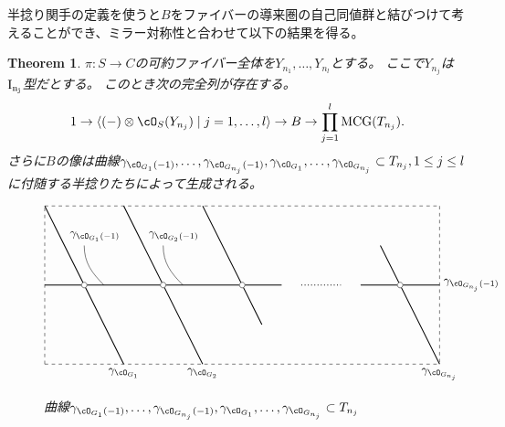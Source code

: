 \documentclass[uplatex,a4paper,dvipdfmx]{jsarticle}
\theoremstyle{plain}
\newtheorem{theorem}{Theorem}[section]
\theoremstyle{definition}
\DeclareMathOperator{\MCG}{\mathrm{MCG}}
\begin{document}
半捻り関手の定義を使うと$B$をファイバーの導来圏の自己同値群と結びつけて考えることができ、ミラー対称性と合わせて以下の結果を得る。
\begin{theorem}
	$\pi \colon S \to C$の可約ファイバー全体を$Y_{n_1}, \dots, Y_{n_l}$とする。
	ここで$Y_{n_j}$は$\rm{I}_{n_j}$型だとする。
	このとき次の完全列が存在する。
	\begin{equation}
		1 \to \langle (-)\otimes \cO_S(Y_{n_j}) \mid j = 1, \dots, l\rangle \to B \to \prod_{j=1}^l \MCG(T_{n_j}).
	\end{equation}
	さらに$B$の像は曲線$\gamma_{\cO_{G_1}(-1)}, \dots, \gamma_{\cO_{G_{n_j}}(-1)}, \gamma_{\cO_{G_1}}, \dots, \gamma_{\cO_{G_{n_j}}} \subset T_{n_j}, 1\leq j \leq l$に付随する半捻りたちによって生成される。
	\begin{figure}[h]
		\centering
		\begin{displaymath}
			\begin{tikzpicture}[scale=1.2]
				\draw[dashed] (0,0)--(10,0);
				\draw[dashed] (0,0)--(0,4);
				\draw[dashed] (0,4)--(10,4);
				\draw[dashed] (10,4)--(10,0);

				\draw[thick] (0, 2)--(1, 2);
				\draw[thick] (1, 2)--(3, 2);
				\draw[thick] (3, 2)--(5, 2);
				\draw[thick] (5, 2)--(6, 2);
				\draw[thick] (8, 2)--(9, 2);
				\draw[thick] (9, 2)--(10, 2);


				\draw[thick] (0, 4)--(1, 2);
				\draw[thick] (1, 2)--(2, 0);
				\draw[thick] (2, 4)--(4, 0);
				\draw[thick] (4, 4)--(5, 2);
				\draw[thick] (5, 2)--(5.5, 1);
				\draw[thick] (8.5, 3)--(9, 2);
				\draw[thick] (9, 2)--(10, 0);

				\draw[dotted, thick] (5+1.5, 2)--(9-1.5, 2);
				\foreach \u in {1, 3, 5, 9}
					{
						\filldraw[white] (\u, 2) circle (2pt);
						\draw[black] (\u, 2) circle (2pt);
					}

				\draw(2, 0) node[below]{$\gamma_{\cO_{G_1}}$};
				\draw(4, 0) node[below]{$\gamma_{\cO_{G_2}}$};
				\draw(10, 0) node[below]{$\gamma_{\cO_{G_{n_j}}}$};

				\draw(2, 3) node[above left]{$\gamma_{\cO_{G_1}(-1)}$};
				\draw(1, 3) to[out=-90,in=135](1.5, 2);
				\draw(4, 3) node[above left]{$\gamma_{\cO_{G_2}(-1)}$};
				\draw(3, 3) to[out=-90,in=135](3.5, 2);

				\draw(10, 2) node[right]{$\gamma_{\cO_{G_{n_j}}(-1)}$};

			\end{tikzpicture}
		\end{displaymath}
		\caption{曲線$\gamma_{\cO_{G_1}(-1)}, \dots, \gamma_{\cO_{G_{n_j}}(-1)}, \gamma_{\cO_{G_1}}, \dots, \gamma_{\cO_{G_{n_j}}} \subset T_{n_j}$}
	\end{figure}
\end{theorem}


\end{document}
